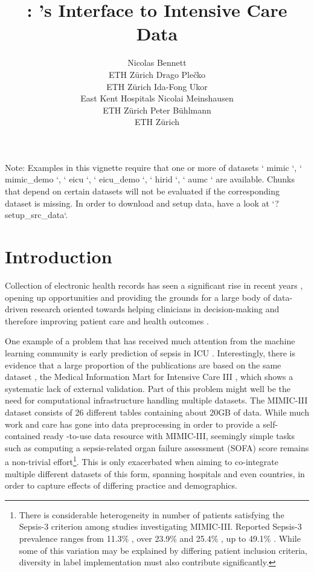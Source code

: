 \documentclass[
  notitle]{jss}
\author{
Nicolas Bennett\footnotemark[1]\\ETH Zürich \And Drago
Plečko\footnotemark[1]\footnotetext[1]{These authors contributed equally.}\\ETH Zürich \And Ida-Fong Ukor\\East Kent Hospitals \AND Nicolai Meinshausen\\ETH Zürich \And Peter Bühlmann\\ETH Zürich
}
\title{\pkg{ricu}: \proglang{R}'s Interface to Intensive Care Data}
\begin{document}
\begin{CodeChunk}
\begin{CodeOutput}
Note: Examples in this vignette require that one or more of datasets `
mimic `, ` mimic_demo `, ` eicu `, ` eicu_demo `, ` hirid `, ` aumc `
are available. Chunks that depend on certain datasets will not be
evaluated if the corresponding dataset is missing. In order to download
and setup data, have a look at `?setup_src_data`.
\end{CodeOutput}
\end{CodeChunk}

\maketitle

\hypertarget{introduction}{%
\section{Introduction}\label{introduction}}

Collection of electronic health records has seen a significant rise in
recent years \citep{evans2016}, opening up opportunities and providing
the grounds for a large body of data-driven research oriented towards
helping clinicians in decision-making and therefore improving patient
care and health outcomes \citep{jiang2017}.

One example of a problem that has received much attention from the
machine learning community is early prediction of sepsis in ICU
\citep{desautels2016, nemati2018, futoma2017, kam2017}. Interestingly,
there is evidence that a large proportion of the publications are based
on the same dataset \citep{fleuren2019}, the Medical Information Mart
for Intensive Care III \citep[MIMIC-III;][]{johnson2016}, which shows a
systematic lack of external validation. Part of this problem might well
be the need for computational infrastructure handling multiple datasets.
The MIMIC-III dataset consists of 26 different tables containing about
20GB of data. While much work and care has gone into data preprocessing
in order to provide a self-contained ready -to-use data resource with
MIMIC-III, seemingly simple tasks such as computing a sepsis-related
organ failure assessment (SOFA) score \citep{vincent1996} remains a
non-trivial effort\footnote{There is considerable heterogeneity in
  number of patients satisfying the Sepsis-3 criterion
  \citep[of which SOFA provides a major component;][]{singer2016} among
  studies investigating MIMIC-III. Reported Sepsis-3 prevalence ranges
  from 11.3\% \citep{desautels2016}, over 23.9\% \citep{nemati2018} and
  25.4\% \citep{wang2018}, up to 49.1\% \citep{johnson2018}. While some
  of this variation may be explained by differing patient inclusion
  criteria, diversity in label implementation must also contribute
  significantly.}. This is only exacerbated when aiming to co-integrate
multiple different datasets of this form, spanning hospitals and even
countries, in order to capture effects of differing practice and
demographics.
\end{document}
